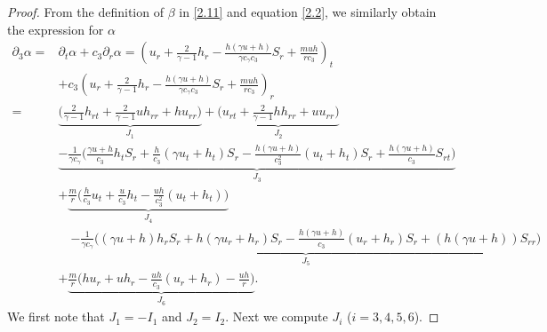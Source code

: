 \documentclass[11pt,reqno]{article}
\numberwithin{equation}{section}
\begin{document}
\begin{proof}
From the definition of $\beta$ in \eqref{2.11} and equation \eqref{2.2}, we similarly obtain the expression for $\alpha$
\begin{align}\label{3.6}
\partial_3\alpha=& \partial_t\alpha + c_3\partial_r \alpha =\left(u_r+\frac{2}{\gamma-1}h_r-\frac{h(\gamma u+h)}{\gamma c_\gamma c_3}S_r+\frac{m uh}{rc_3}\right)_t \nonumber\\
    & +c_3\left(u_r+\frac{2}{\gamma-1}h_r-\frac{h(\gamma u+h)}{\gamma c_\gamma c_3}S_r+\frac{m uh}{rc_3}\right)_r
    \nonumber\\
=&\underbrace{\Big(\frac{2}{\gamma-1}h_{rt}+\frac{2}{\gamma-1}uh_{rr}+hu_{rr}\Big)}_{J_1}
    +\underbrace{\Big(u_{rt}+\frac{2}{\gamma-1}hh_{rr}+uu_{rr}\Big)}_{J_2}
    \nonumber\\
    & \underbrace{-\frac{1}{\gamma c_\gamma}\Big(\frac{\gamma u+h}{c_3}h_tS_r+\frac{h}{c_3}(\gamma u_t+h_t)S_r-\frac{h(\gamma u+h)}{c_3^2}(u_t+h_t)S_r+\frac{h(\gamma u+h)}{c_3}S_{rt}\Big)}_{J_3}
    \nonumber\\
    & +\underbrace{\frac{m}{r}\Big(\frac{h}{c_3}u_t+\frac{u}{c_3}h_t -\frac{uh}{c_3^2}(u_t+h_t)\Big)}_{J_4}
    \nonumber\\
    &\quad\underbrace{-\frac{1}{\gamma c_\gamma}\Big((\gamma u+h)h_rS_r+h(\gamma u_r+h_r)S_r-\frac{h(\gamma u+h)}{c_3}(u_r+h_r)S_r+(h(\gamma u+h))S_{rr}\Big)}_{J_5}
    \nonumber\\
    & +\underbrace{\frac{m}{r}\Big(hu_r+uh_r-\frac{uh}{c_3}(u_r+h_r)-\frac{uh}{r}\Big)}_{J_6}.
\end{align}
We first note that $J_1=-I_1$ and $J_2=I_2$. Next we compute $J_{i}$ ($i=3,4,5,6$).


\end{proof}
\end{document}
